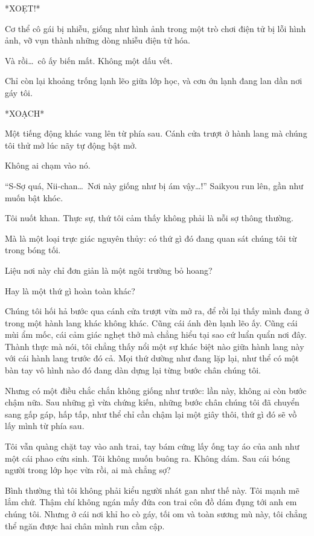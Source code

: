 \documentclass[../main.tex]{subfiles}
\begin{document}
*XOẸT!*

Cơ thể cô gái bị nhiễu, giống như hình ảnh trong một trò chơi điện tử bị lỗi hình ảnh, vỡ vụn thành những dòng nhiễu điện tử hóa.

Và rồi\dots\ cô ấy biến mất. Không một dấu vết.

Chỉ còn lại khoảng trống lạnh lẽo giữa lớp học, và cơn ớn lạnh đang lan dần nơi gáy tôi.

*XOẠCH*

Một tiếng động khác vang lên từ phía sau. Cánh cửa trượt ở hành lang mà chúng tôi thử mở lúc nãy tự động bật mở.

Không ai chạm vào nó.

``S-Sợ quá, Nii-chan\dots\ Nơi này giống như bị ám vậy\dots!'' Saikyou run lên, gần như muốn bật khóc.

Tôi nuốt khan. Thực sự, thứ tôi cảm thấy không phải là nỗi sợ thông thường.

Mà là một loại trực giác nguyên thủy: có thứ gì đó đang quan sát chúng tôi từ trong bóng tối.

Liệu nơi này chỉ đơn giản là một ngôi trường bỏ hoang?

Hay là một thứ gì hoàn toàn khác?


Chúng tôi hối hả bước qua cánh cửa trượt vừa mở ra, để rồi lại thấy mình đang ở trong một hành lang khác không khác. Cũng cái ánh đèn lạnh lẽo ấy. Cũng cái mùi ẩm mốc, cái cảm giác nghẹt thở mà chẳng hiểu tại sao cứ luẩn quẩn nơi đây. Thành thực mà nói, tôi chẳng thấy nổi một sự khác biệt nào giữa hành lang này với cái hành lang trước đó cả. Mọi thứ dường như đang lặp lại, như thể có một bàn tay vô hình nào đó đang dàn dựng lại từng bước chân chúng tôi.

Nhưng có một điều chắc chắn không giống như trước: lần này, không ai còn bước chậm nữa. Sau những gì vừa chứng kiến, những bước chân chúng tôi đã chuyển sang gấp gáp, hấp tấp, như thể chỉ cần chậm lại một giây thôi, thứ gì đó sẽ vồ lấy mình từ phía sau.

Tôi vẫn quàng chặt tay vào anh trai, tay bám cứng lấy ống tay áo của anh như một cái phao cứu sinh. Tôi không muốn buông ra. Không dám. Sau cái bóng người trong lớp học vừa rồi, ai mà chẳng sợ?

Bình thường thì tôi không phải kiểu người nhát gan như thế này. Tôi mạnh mẽ lắm chứ. Thậm chí không ngán mấy đứa con trai côn đồ dám đụng tới anh em chúng tôi. Nhưng ở cái nơi khỉ ho cò gáy, tối om và toàn sương mù này, tôi chẳng thể ngăn được hai chân mình run cầm cập.
\end{document}
